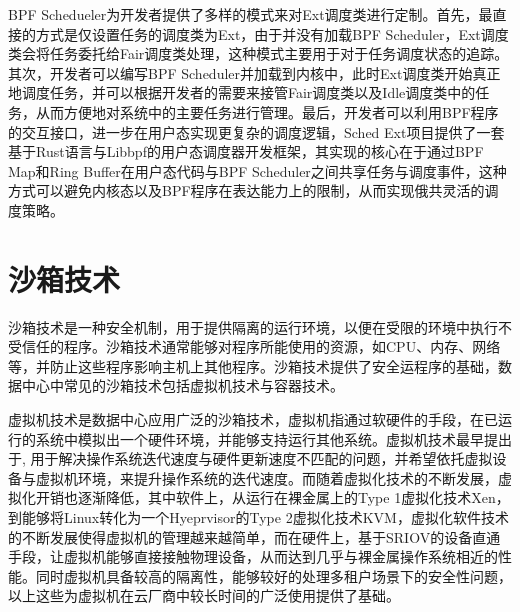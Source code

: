 BPF Schedueler为开发者提供了多样的模式来对Ext调度类进行定制。首先，最直接的方式是仅设置任务的调度类为Ext，由于并没有加载BPF Scheduler，Ext调度类会将任务委托给Fair调度类处理，这种模式主要用于对于任务调度状态的追踪。其次，开发者可以编写BPF Scheduler并加载到内核中，此时Ext调度类开始真正地调度任务，并可以根据开发者的需要来接管Fair调度类以及Idle调度类中的任务，从而方便地对系统中的主要任务进行管理。最后，开发者可以利用BPF程序的交互接口，进一步在用户态实现更复杂的调度逻辑，Sched Ext项目提供了一套基于Rust语言与Libbpf的用户态调度器开发框架，其实现的核心在于通过BPF Map和Ring Buffer在用户态代码与BPF Scheduler之间共享任务与调度事件，这种方式可以避免内核态以及BPF程序在表达能力上的限制，从而实现俄共灵活的调度策略。

\section{沙箱技术}


沙箱技术是一种安全机制，用于提供隔离的运行环境，以便在受限的环境中执行不受信任的程序。沙箱技术通常能够对程序所能使用的资源，如CPU、内存、网络等，并防止这些程序影响主机上其他程序。沙箱技术提供了安全运程序的基础，数据中心中常见的沙箱技术包括虚拟机技术与容器技术。

虚拟机技术是数据中心应用广泛的沙箱技术，虚拟机指通过软硬件的手段，在已运行的系统中模拟出一个硬件环境，并能够支持运行其他系统。虚拟机技术最早提出于\citep{bugnion1997disco}, 用于解决操作系统迭代速度与硬件更新速度不匹配的问题，并希望依托虚拟设备与虚拟机环境，来提升操作系统的迭代速度。而随着虚拟化技术的不断发展，虚拟化开销也逐渐降低，其中软件上，从运行在裸金属上的Type 1虚拟化技术Xen\citep{barham2003xen}，到能够将Linux转化为一个Hyeprvisor的Type 2虚拟化技术KVM\citep{kivity2007kvm}，虚拟化软件技术的不断发展使得虚拟机的管理越来越简单，而在硬件上，基于SRIOV的设备直通手段\citep{dong2012high}，让虚拟机能够直接接触物理设备，从而达到几乎与裸金属操作系统相近的性能。同时虚拟机具备较高的隔离性，能够较好的处理多租户场景下的安全性问题，以上这些为虚拟机在云厂商中较长时间的广泛使用提供了基础。

